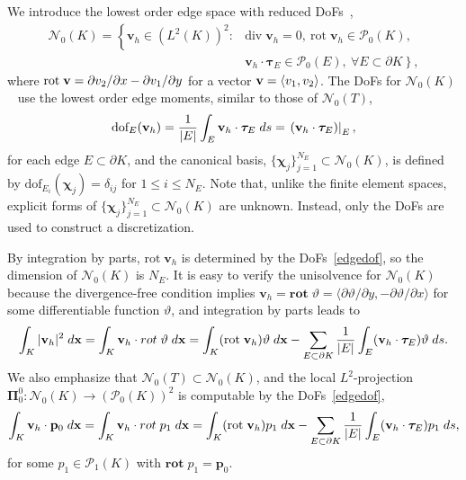 \documentclass[a4paper]{article}
\theoremstyle{plain}
\theoremstyle{definition}
\numberwithin{equation}{section}
\newcommand{\bv}{{\bf v}}
\begin{document}
We introduce the lowest order edge space with reduced DoFs~\cite{BEI16(3),BEI17(2)},
\begin{align*}
\mathcal{N}_0(K)=\left\{\mathbf{v}_h\in(L^2(K))^2 \right.: &\text{div}\;\mathbf{v}_h=0,\ \text{rot}\;\mathbf{v}_h\in\mathcal{P}_0(K),\\
&\left.\mathbf{v}_h\cdot\bm{\tau}_E\in\mathcal{P}_0(E),\ \forall E\subset\partial K\right\},
\end{align*}
where $\text{rot}\;\bv = \partial v_2/\partial x-\partial v_1/\partial y$
for a vector $\bv=\langle v_1,v_2\rangle$.
The DoFs for $\mathcal{N}_0(K)$~\cite{BEI16(3),BEI17(1),BEI17(2),BEI18} use the lowest order edge moments, similar to those of $\mathcal{N}_0(T)$,
\begin{equation}
\text{dof}_E(\mathbf{v}_h)=\frac{1}{|E|}\int_{E}\mathbf{v}_h\cdot\bm{\tau}_{E}\;{\rm d}s=\left.(\mathbf{v}_h\cdot \bm{\tau}_E)\right|_E\label{edgedof},
\end{equation}
for each edge $E\subset \partial K$, and
the canonical basis, $\{ \bm{\chi}_j\}_{j=1}^{N_E}\subset \mathcal{N}_0(K)$, is defined by $\text{dof}_{E_i}(\bm{\chi}_j)=\delta_{ij}$ for $1\leq i\leq N_E$. Note that, unlike the finite element spaces, explicit forms of $\{ \bm{\chi}_j\}_{j=1}^{N_E}\subset \mathcal{N}_0(K)$ are unknown. Instead, only the DoFs are used to construct a discretization.

By integration by parts, $\text{rot}\;\mathbf{v}_h$ is determined by the DoFs~\eqref{edgedof}, so the dimension of $\mathcal{N}_0(K)$ is $N_E$.
It is easy to verify the unisolvence for $\mathcal{N}_0(K)$ because the divergence-free condition implies $\mathbf{v}_h=\textbf{rot}\;\vartheta=\langle\partial\vartheta/\partial y,-\partial\vartheta/\partial x\rangle$ for some differentiable function $\vartheta$, and integration by parts leads to
\begin{equation*}
\int_K|\mathbf{v}_h|^2\;{\rm d}\mathbf{x}=\int_K\mathbf{v}_h\cdot\textbf{rot}\;\vartheta\;{\rm d}\mathbf{x}=\int_K(\text{rot}\;\mathbf{v}_h)\vartheta\;{\rm d}\mathbf{x}-\sum_{E\subset\partial K}\frac{1}{|E|}\int_E(\mathbf{v}_h\cdot\bm{\tau}_E)\vartheta\;{\rm d}s.
\end{equation*}
We also emphasize that $\mathcal{N}_0(T)\subset \mathcal{N}_0(K)$, and the local $L^2$-projection $\bm{\Pi}_{0}^0:\mathcal{N}_0(K)\rightarrow(\mathcal{P}_0(K))^2$ is computable by the DoFs~\eqref{edgedof},
\begin{equation*}
\int_K\mathbf{v}_h\cdot\mathbf{p}_0\;{\rm d}\mathbf{x}=\int_K\mathbf{v}_h\cdot\textbf{rot}\;p_1\;{\rm d}\mathbf{x}=\int_K(\text{rot}\;\mathbf{v}_h)p_1\;{\rm d}\mathbf{x}-\sum_{E\subset\partial K}\frac{1}{|E|}\int_E(\mathbf{v}_h\cdot\bm{\tau}_E)p_1\;{\rm d}s,
\end{equation*}
for some $p_1\in \mathcal{P}_1(K)$ with $\textbf{rot}\;p_1 = \mathbf{p}_0$.
\end{document}
